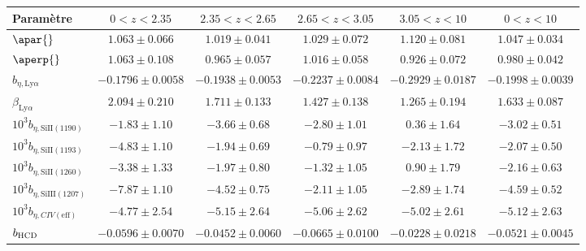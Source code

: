 \begin{table}[]
\begin{tabular}{lccccc}
\toprule
Param\`etre  & $\num{0} < z < \num{2.35}$ & $\num{2.35} < z < \num{2.65}$ & $\num{2.65} < z < \num{3.05}$ & $\num{3.05} < z < \num{10}$  & $\num{0} < z < \num{10}$ \\
\midrule
$\apar{} $ & $ 1.063 \pm 0.066$ & $ 1.019 \pm 0.041$ & $ 1.029 \pm 0.072$ & $ 1.120 \pm 0.081$ & $ 1.047 \pm 0.034$ \\
$\aperp{} $ & $ 1.063 \pm 0.108$ & $ 0.965 \pm 0.057$ & $ 1.016 \pm 0.058$ & $ 0.926 \pm 0.072$ & $ 0.980 \pm 0.042$ \\
$b_{\eta, \mathrm{Ly}\alpha} $ & $ -0.1796 \pm 0.0058$ & $ -0.1938 \pm 0.0053$ & $ -0.2237 \pm 0.0084$ & $ -0.2929 \pm 0.0187$ & $ -0.1998 \pm 0.0039$ \\
$\beta_{\mathrm{Ly}\alpha} $ & $ 2.094 \pm 0.210$ & $ 1.711 \pm 0.133$ & $ 1.427 \pm 0.138$ & $ 1.265 \pm 0.194$ & $ 1.633 \pm 0.087$ \\
$10^3 b_{\eta, \mathrm{SiII}(1190)} $ & $ -1.83 \pm 1.10$ & $ -3.66 \pm 0.68$ & $ -2.80 \pm 1.01$ & $ 0.36 \pm 1.64$ & $ -3.02 \pm 0.51$ \\
$10^3 b_{\eta, \mathrm{SiII}(1193)} $ & $ -4.83 \pm 1.10$ & $ -1.94 \pm 0.69$ & $ -0.79 \pm 0.97$ & $ -2.13 \pm 1.72$ & $ -2.07 \pm 0.50$ \\
$10^3 b_{\eta, \mathrm{SiII}(1260)} $ & $ -3.38 \pm 1.33$ & $ -1.97 \pm 0.80$ & $ -1.32 \pm 1.05$ & $ 0.90 \pm 1.79$ & $ -2.16 \pm 0.63$ \\
$10^3 b_{\eta, \mathrm{SiIII}(1207)} $ & $ -7.87 \pm 1.10$ & $ -4.52 \pm 0.75$ & $ -2.11 \pm 1.05$ & $ -2.89 \pm 1.74$ & $ -4.59 \pm 0.52$ \\
$10^3 b_{\eta, CIV(\mathrm{eff})} $ & $ -4.77 \pm 2.54$ & $ -5.15 \pm 2.64$ & $ -5.06 \pm 2.62$ & $ -5.02 \pm 2.61$ & $ -5.12 \pm 2.63$ \\
$b_{\textsc{HCD}} $ & $ -0.0596 \pm 0.0070$ & $ -0.0452 \pm 0.0060$ & $ -0.0665 \pm 0.0100$ & $ -0.0228 \pm 0.0218$ & $ -0.0521 \pm 0.0045$ \\

\end{tabular}
\end{table}
